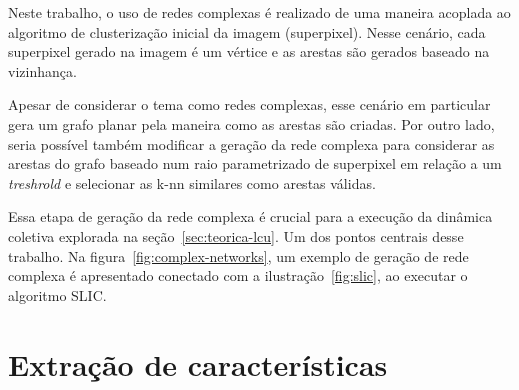 Neste trabalho, o uso de redes complexas é realizado de uma maneira
acoplada ao algoritmo de clusterização inicial da imagem (superpixel). Nesse
cenário, cada superpixel gerado na imagem é um vértice e as arestas
são gerados baseado na vizinhança.

Apesar de considerar o tema como redes complexas, esse cenário em
particular gera um grafo planar pela maneira como as arestas são
criadas. Por outro lado, seria possível também modificar a geração da
rede complexa para considerar as arestas do grafo baseado num raio
parametrizado de superpixel em relação a um \textit{treshrold} e
selecionar as k-nn similares como arestas válidas.

Essa etapa de geração da rede complexa é crucial para a execução da
dinâmica coletiva explorada na seção~\ref{sec:teorica-lcu}. Um dos
pontos centrais desse trabalho. Na figura~\ref{fig:complex-networks},
um exemplo de geração de rede complexa é apresentado conectado com a
ilustração~\ref{fig:slic}, ao executar o algoritmo SLIC.\@

\begin{figure}[t]
        \captionsetup{width=12cm}
		\centering
\end{figure}
\FloatBarrier{}

\section{Extração de características}\label{sec:extracao-caracteristicas}

